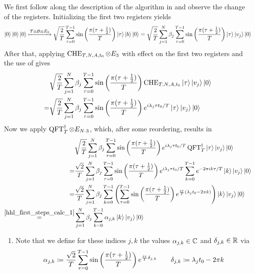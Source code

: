 We first follow along the description of the algorithm in  and observe the change of the registers. Initializing the first two registers yields
\begin{align}
    \ket{0}\ket{0}\ket{0} \xmapsto{\mathcal{T} \otimes \mathcal{B} \otimes E_3} \sqrt{\frac{2}{T}} \sum_{\tau = 0}^{T-1} \sin\left(\frac{\pi(\tau+\frac{1}{2})}{T}\right)\ket{\tau} \ket{b} \ket{0} = \sqrt{\frac{2}{T}} \sum_{j = 1}^N \beta_j \sum_{\tau = 0}^{T-1} \sin\left(\frac{\pi(\tau+\frac{1}{2})}{T}\right)\ket{\tau} \ket{v_j} \ket{0}
\end{align}
After that, applying \(\operatorname{CHE}_{T, N, A, t_0} \otimes E_3\) with effect on the first two registers and the use of  gives
\begin{align}
    &\sqrt{\frac{2}{T}} \sum_{j = 1}^N \beta_j \sum_{\tau = 0}^{T-1} \sin\left(\frac{\pi(\tau+\frac{1}{2})}{T}\right)\operatorname{CHE}_{T, N, A, t_0} \ket{\tau} \ket{v_j} \ket{0}\\
    =& \sqrt{\frac{2}{T}} \sum_{j = 1}^N \beta_j \sum_{\tau = 0}^{T-1} \sin\left(\frac{\pi(\tau+\frac{1}{2})}{T}\right) e^{i \lambda_j \tau t_0 / T} \ket{\tau} \ket{v_j} \ket{0}
\end{align}
Now we apply \(\operatorname{QFT}^\dagger_T \otimes E_{N \cdot 3}\), which, after some reordering, results in
\begin{align}
    &\sqrt{\frac{2}{T}} \sum_{j = 1}^N \beta_j \sum_{\tau = 0}^{T-1} \sin\left(\frac{\pi(\tau+\frac{1}{2})}{T}\right) e^{i \lambda_j \tau t_0 / T} \operatorname{QFT}^\dagger_T \ket{\tau} \ket{v_j} \ket{0}\\
    =& \frac{\sqrt{2}}{T} \sum_{j = 1}^N \beta_j \sum_{\tau = 0}^{T-1} \sin\left(\frac{\pi(\tau+\frac{1}{2})}{T}\right) e^{i \lambda_j \tau t_0 / T} \sum_{k=0}^{T-1} e^{-2 \pi i k \tau / T} \ket{k} \ket{v_j} \ket{0}\\
    =& \frac{\sqrt{2}}{T} \sum_{j = 1}^N \beta_j \sum_{k = 0}^{T-1} \left(\sum_{\tau = 0}^{T-1} \sin\left(\frac{\pi(\tau+\frac{1}{2})}{T}\right) e^{\frac{i \tau}{T} (\lambda_j t_0 - 2 \pi k)}\right) \ket{k} \ket{v_j} \ket{0}\\
    \overset{\ref{hhl_first_steps_calc_1}}{=}& \sum_{j = 1}^N \beta_j \sum_{k = 0}^{T-1} \alpha_{j, k} \ket{k} \ket{v_j} \ket{0}
\end{align}

\begin{enumerate}[label=(\arabic*)]
    \item \label{hhl_first_steps_calc_1} Note that we define for these indices \(j, k\) the values \(\alpha_{j, k} \in \mathbb{C}\) and \(\delta_{j, k} \in \mathbb{R}\) via
    \begin{align}
        \alpha_{j, k} \coloneqq \frac{\sqrt{2}}{T} \sum_{\tau = 0}^{T-1} \sin\left(\frac{\pi(\tau+\frac{1}{2})}{T}\right) e^{\frac{i \tau}{T} \delta_{j, k}} \qquad \delta_{j, k} \coloneqq \lambda_j t_0 - 2 \pi k \label{ajk_djk_helpers}
    \end{align}
\end{enumerate}


